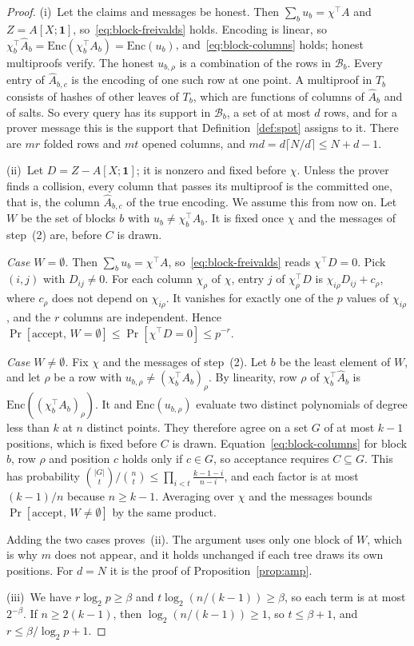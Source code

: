 \documentclass[conference,compsoc]{IEEEtran}
\newcommand{\T}{\top}
\newcommand{\enc}{\mathrm{Enc}}
\theoremstyle{plain}
\theoremstyle{definition}
\theoremstyle{remark}
\begin{document}
\begin{proof}
(i)~Let the claims and messages be honest. Then $\sum_bu_b=\chi^\T A$ and $Z=A[X;\mathbf 1]$,
so~\eqref{eq:block-freivalds} holds. Encoding is linear, so
$\chi_b^\T\hat A_b=\enc(\chi_b^\T A_b)=\enc(u_b)$, and~\eqref{eq:block-columns} holds; honest
multiproofs verify. The honest $u_{b,\rho}$ is a combination of the rows in $\mathcal B_b$. Every
entry of $\hat A_{b,c}$ is the encoding of one such row at one point. A multiproof in $T_b$ consists
of hashes of other leaves of $T_b$, which are functions of columns of $\hat A_b$ and of salts. So every
query has its support in $\mathcal B_b$, a set of at most $d$ rows, and for a prover message this is
the support that Definition~\ref{def:spot} assigns to it. There are $mr$ folded rows and $mt$ opened
columns, and $md=d\lceil N/d\rceil\le N+d-1$.

(ii)~Let $D=Z-A[X;\mathbf 1]$; it is nonzero and fixed before $\chi$. Unless the prover finds a
collision, every column that passes its multiproof is the committed one, that is, the column
$\hat A_{b,c}$ of the true encoding. We assume this from now on. Let $W$ be the set of blocks $b$ with
$u_b\neq\chi_b^\T A_b$. It is fixed once $\chi$ and the messages of step~(2) are, before $C$ is drawn.

\emph{Case $W=\emptyset$.} Then $\sum_bu_b=\chi^\T A$, so~\eqref{eq:block-freivalds} reads
$\chi^\T D=0$. Pick $(i,j)$ with $D_{ij}\neq0$. For each column $\chi_\rho$ of $\chi$, entry $j$ of
$\chi_\rho^\T D$ is $\chi_{i\rho}D_{ij}+c_\rho$, where $c_\rho$ does not depend on $\chi_{i\rho}$. It
vanishes for exactly one of the $p$ values of $\chi_{i\rho}$, and the $r$ columns are independent.
Hence $\Pr[\text{accept},\,W=\emptyset]\le\Pr[\chi^\T D=0]\le p^{-r}$.

\emph{Case $W\neq\emptyset$.} Fix $\chi$ and the messages of step~(2). Let $b$ be the least element
of $W$, and let $\rho$ be a row with $u_{b,\rho}\neq(\chi_b^\T A_b)_\rho$. By linearity, row $\rho$ of
$\chi_b^\T\hat A_b$ is $\enc((\chi_b^\T A_b)_\rho)$. It and $\enc(u_{b,\rho})$ evaluate two distinct
polynomials of degree less than $k$ at $n$ distinct points. They therefore agree on a set $G$ of at
most $k-1$ positions, which is fixed before $C$ is drawn. Equation~\eqref{eq:block-columns} for block
$b$, row $\rho$ and position $c$ holds only if $c\in G$, so acceptance requires $C\subseteq G$. This
has probability $\binom{|G|}{t}/\binom nt\le\prod_{i<t}\frac{k-1-i}{n-i}$, and each factor is at
most $(k-1)/n$ because $n\ge k-1$. Averaging over $\chi$ and the messages bounds
$\Pr[\text{accept},\,W\neq\emptyset]$ by the same product.

Adding the two cases proves~(ii). The argument uses only one block of $W$, which is why $m$ does not
appear, and it holds unchanged if each tree draws its own positions. For $d=N$ it is the proof of
Proposition~\ref{prop:amp}.

(iii)~We have $r\log_2p\ge\beta$ and $t\log_2(n/(k-1))\ge\beta$, so each term is at most
$2^{-\beta}$. If $n\ge2(k-1)$, then $\log_2(n/(k-1))\ge1$, so $t\le\beta+1$, and
$r\le\beta/\log_2p+1$.
\end{proof}
\end{document}
